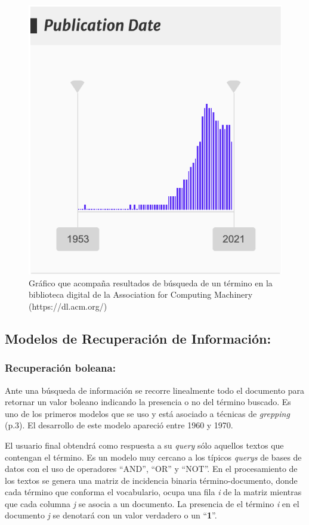 \documentclass[
  10,
  openany]{book}
\begin{document}
\begin{figure}

\includegraphics[width=0.4\linewidth]{images/03-marco-teorico/busquedaacm} \hfill{}

\caption{Gráfico que acompaña resultados de búsqueda de un término en la biblioteca digital de la Association for Computing Machinery (https://dl.acm.org/)}\label{fig:busquedasacm}
\end{figure}

\hypertarget{MRI}{%
\subsection{Modelos de Recuperación de Información:}\label{MRI}}

\hypertarget{MRIbol}{%
\subsubsection{Recuperación boleana:}\label{MRIbol}}

Ante una búsqueda de información se recorre linealmente todo el documento para retornar un valor boleano indicando la presencia o no del término buscado. Es uno de los primeros modelos que se uso y está asociado a técnicas de \emph{grepping} \citep{manning2008} (p.3). El desarrollo de este modelo apareció entre 1960 y 1970.

El usuario final obtendrá como respuesta a su \emph{query} sólo aquellos textos que contengan el término. Es un modelo muy cercano a los típicos \emph{querys} de bases de datos con el uso de operadores ``AND'', ``OR'' y ``NOT''. En el procesamiento de los textos se genera una matriz de incidencia binaria término-documento, donde cada término que conforma el vocabulario, ocupa una fila \emph{i} de la matriz mientras que cada columna \emph{j} se asocia a un documento. La presencia de el término \emph{i} en el documento \emph{j} se denotará con un valor verdadero o un ``\textbf{1}''.
\end{document}
